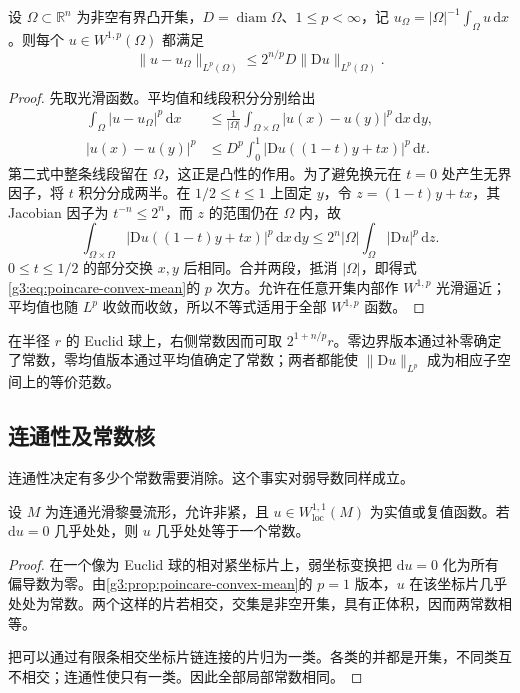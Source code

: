 \begin{proposition}\label{g3:prop:poincare-convex-mean}
	设 \(\Omega\subset\mathbb R^n\) 为非空有界凸开集，\(D=\operatorname{diam}\Omega\)、\(1\le p<\infty\)，记 \(u_\Omega=|\Omega|^{-1}\int_\Omega u\,\mathrm dx\)。则每个 \(u\in W^{1,p}(\Omega)\) 都满足
	\begin{equation}\label{g3:eq:poincare-convex-mean}
		\|u-u_\Omega\|_{L^p(\Omega)}\le2^{n/p}D\|\mathrm D u\|_{L^p(\Omega)}.
	\end{equation}
\end{proposition}
\begin{proof}
	先取光滑函数。平均值和线段积分分别给出
	\[
	\begin{aligned}
		\int_\Omega|u-u_\Omega|^p\,\mathrm dx
		&\le\frac1{|\Omega|}\int_{\Omega\times\Omega}|u(x)-u(y)|^p\,\mathrm dx\,\mathrm dy,\\
		|u(x)-u(y)|^p
		&\le D^p\int_0^1|\mathrm D u((1-t)y+tx)|^p\,\mathrm dt.
	\end{aligned}
	\]
	第二式中整条线段留在 \(\Omega\)，这正是凸性的作用。为了避免换元在 \(t=0\) 处产生无界因子，将 \(t\) 积分分成两半。在 \(1/2\le t\le1\) 上固定 \(y\)，令 \(z=(1-t)y+tx\)，其 Jacobian 因子为 \(t^{-n}\le2^n\)，而 \(z\) 的范围仍在 \(\Omega\) 内，故
	\[
		\int_{\Omega\times\Omega}|\mathrm D u((1-t)y+tx)|^p\,\mathrm dx\,\mathrm dy
		\le2^n|\Omega|\int_\Omega|\mathrm D u|^p\,\mathrm dz.
	\]
	\(0\le t\le1/2\) 的部分交换 \(x,y\) 后相同。合并两段，抵消 \(|\Omega|\)，即得式\eqref{g3:eq:poincare-convex-mean}的 \(p\) 次方。允许在任意开集内部作 \(W^{1,p}\) 光滑逼近；平均值也随 \(L^p\) 收敛而收敛，所以不等式适用于全部 \(W^{1,p}\) 函数。
\end{proof}

在半径 \(r\) 的 Euclid 球上，右侧常数因而可取 \(2^{1+n/p}r\)。零边界版本通过补零确定了常数，零均值版本通过平均值确定了常数；两者都能使 \(\|\mathrm D u\|_{L^p}\) 成为相应子空间上的等价范数。

\subsection{连通性及常数核}
\label{g3:subsec:1104:02}
连通性决定有多少个常数需要消除。这个事实对弱导数同样成立。

\begin{proposition}\label{g3:prop:weak-gradient-constant}
	设 \(M\) 为连通光滑黎曼流形，允许非紧，且 \(u\in W^{1,1}_{\mathrm{loc}}(M)\) 为实值或复值函数。若 \(\mathrm du=0\) 几乎处处，则 \(u\) 几乎处处等于一个常数。
\end{proposition}
\begin{proof}
	在一个像为 Euclid 球的相对紧坐标片上，弱坐标变换把 \(\mathrm du=0\) 化为所有偏导数为零。由\cref{g3:prop:poincare-convex-mean}的 \(p=1\) 版本，\(u\) 在该坐标片几乎处处为常数。两个这样的片若相交，交集是非空开集，具有正体积，因而两常数相等。

	把可以通过有限条相交坐标片链连接的片归为一类。各类的并都是开集，不同类互不相交；连通性使只有一类。因此全部局部常数相同。
\end{proof}

